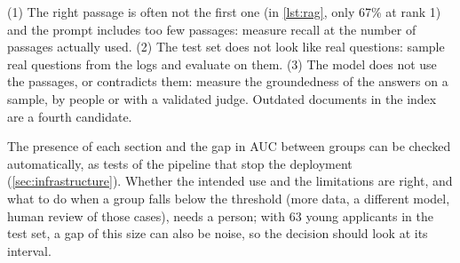 \begin{description}[font=\bfseries,leftmargin=0pt,itemsep=5pt]
  \item[\ref{exr5:rag}] (1) The right passage is often not the first one (in \cref{lst:rag}, only 67\% at rank 1) and the
        prompt includes too few passages: measure recall at the number of passages actually used. (2) The test set does not
        look like real questions: sample real questions from the logs and evaluate on them. (3) The model does not use the
        passages, or contradicts them: measure the groundedness of the answers on a sample, by people or with a validated
        judge. Outdated documents in the index are a fourth candidate.
\item[\ref{exr5:modelcard}] The presence of each section and the gap in AUC between groups can be
checked automatically, as tests of the pipeline that stop the deployment (\cref{sec:infrastructure}).
Whether the intended use and the limitations are right, and what to do when a group falls below
the threshold (more data, a different model, human review of those cases), needs a person; with
63 young applicants in the test set, a gap of this size can also be noise, so the decision should
look at its interval.
\end{description}

